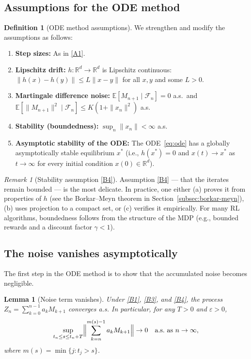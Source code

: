 \documentclass[11pt,a4paper]{article}
\theoremstyle{definition}
\newtheorem{definition}{Definition}[section]
\theoremstyle{plain}
\newtheorem{lemma}[theorem]{Lemma}
\theoremstyle{remark}
\newtheorem{remark}{Remark}[section]
\newcommand{\R}{\mathbb{R}}
\newcommand{\E}{\mathbb{E}}
\begin{document}
\subsection{Assumptions for the ODE method}

\begin{definition}[ODE method assumptions]
\label{def:ode-assumptions}
We strengthen and modify the assumptions as follows:
\begin{enumerate}[label=(B\arabic*)]
\item \label{B1} \textbf{Step sizes:} As in \ref{A1}.
\item \label{B2} \textbf{Lipschitz drift:} $h : \R^d \to \R^d$ is Lipschitz
  continuous: $\|h(x) - h(y)\| \leq L\|x - y\|$ for all $x, y$ and some $L > 0$.
\item \label{B3} \textbf{Martingale difference noise:}
  $\E[M_{n+1} \mid \mathcal{F}_n] = 0$ a.s.\ and
  $\E[\|M_{n+1}\|^2 \mid \mathcal{F}_n] \leq K(1 + \|x_n\|^2)$ a.s.
\item \label{B4} \textbf{Stability (boundedness):} $\sup_n \|x_n\| < \infty$ a.s.
\item \label{B5} \textbf{Asymptotic stability of the ODE:} The ODE~\eqref{eq:ode}
  has a globally asymptotically stable equilibrium $x^*$ (i.e., $h(x^*) = 0$ and
  $x(t) \to x^*$ as $t \to \infty$ for every initial condition $x(0) \in \R^d$).
\end{enumerate}
\end{definition}

\begin{remark}[Stability assumption \ref{B4}]
\label{rem:stability}
Assumption \ref{B4} --- that the iterates remain bounded --- is the most delicate.
In practice, one either (a) proves it from properties of $h$ (see the Borkar--Meyn
theorem in Section~\ref{subsec:borkar-meyn}), (b) uses projection to a compact set,
or (c) verifies it empirically. For many RL algorithms, boundedness follows from the
structure of the MDP (e.g., bounded rewards and a discount factor $\gamma < 1$).
\end{remark}

\subsection{The noise vanishes asymptotically}

The first step in the ODE method is to show that the accumulated noise becomes
negligible.

\begin{lemma}[Noise term vanishes]
\label{lem:noise-vanishes}
Under \ref{B1}, \ref{B3}, and \ref{B4}, the process
$Z_n = \sum_{k=0}^{n-1} a_k M_{k+1}$ converges a.s. In particular, for any
$T > 0$ and $\varepsilon > 0$,
\[
  \sup_{t_n \leq s \leq t_n + T}
    \Bigl\|\sum_{k=n}^{m(s)-1} a_k M_{k+1}\Bigr\| \to 0 \quad \text{a.s.\ as } n \to \infty,
\]
where $m(s) = \min\{j : t_j > s\}$.
\end{lemma}
\end{document}

